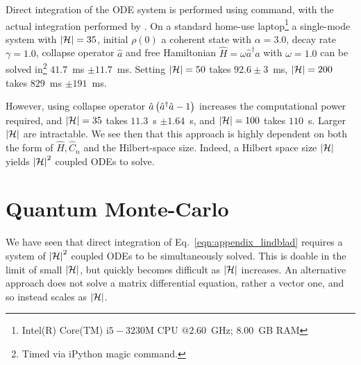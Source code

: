 Direct integration of the ODE system is performed using  command, with the actual integration performed by . On a standard home-use laptop\footnote{Intel(R) Core(TM) i$5-3230$M CPU $@ 2.60$~GHz; $8.00$~GB RAM} a single-mode system with $\left|\mathcal{H}\right| = 35$, initial $\rho\left(0\right)$ a coherent state with $\alpha = 3.0$, decay rate $\gamma = 1.0$, collapse operator $\hat{a}$ and free Hamiltonian $\hat{H} = \omega \hat{a}^\dagger \hat{a}$ with $\omega = 1.0$ can be solved in\footnote{Timed via iPython  magic command.} $41.7$~ms $\pm 11.7$~ms. Setting $\left|\mathcal{H}\right| = 50$ takes $92.6 \pm 3$~ms, $\left|\mathcal{H}\right| = 200$ takes $829$~ms $\pm 191$~ms.

However, using collapse operator $\hat{a}\left(\hat{a}^\dagger \hat{a} - 1\right)$ increases the computational power required, %
and $\left|\mathcal{H}\right| = 35$ takes $11.3$~s $\pm 1.64$~s, and $\left|\mathcal{H}\right|=100$ takes $110$~s. Larger $\left|\mathcal{H}\right|$ are intractable. We see then that this approach is highly dependent on both the form of $\hat{H}, \hat{C}_n$ and the Hilbert-space size. Indeed, a Hilbert space size $\left|\mathcal{H}\right|$ yields $\left|\mathcal{H}\right|^2$ coupled ODEs to solve. 



\section{Quantum Monte-Carlo}\label{appendix:monte_carlo}
We have seen that direct integration of Eq.~\ref{eqn:appendix_lindblad} requires a system of $\left|\mathcal{H}\right|^2$ coupled ODEs to be simultaneously solved. This is doable in the limit of small $\left|\mathcal{H}\right|$, but quickly becomes difficult as $\left|\mathcal{H}\right|$ increases. An alternative approach does not solve a matrix differential equation, rather a vector one, and so instead scales as $\left|\mathcal{H}\right|$.


